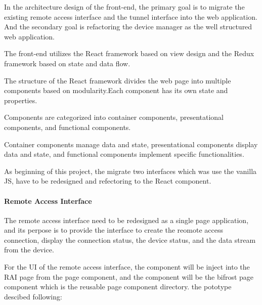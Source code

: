 In the architecture design of the front-end, the primary goal is to migrate the existing 
remote access interface and the tunnel interface into the web application.
And the secondary goal is refactoring the device manager as the well structured web application.

The front-end utilizes the React framework based on view design and the Redux framework 
based on state and data flow.

The structure of the React framework divides the web page into multiple components 
based on modularity.Each component has its own state and properties.

Components are categorized into container components, presentational components, 
and functional components.

Container components manage data and state, presentational components display data 
and state, and functional components implement specific functionalities.

As beginning of this project, the migrate two interfaces which was use the vanilla JS, 
have to be redesigned and refectoring to the React component.

\paragraph{Remote Access Interface}

The remote access interface need to be redesigned as a single page application, 
and its perpose is to provide the interface to create the reomote access connection, 
display the connection status, the device status, and the data stream from the device.

For the UI of the remote access interface, the component will be inject into the RAI page 
from the page component, and the component will be the bifrost page component which is 
the reusable page component directory.  
the pototype descibed following:

